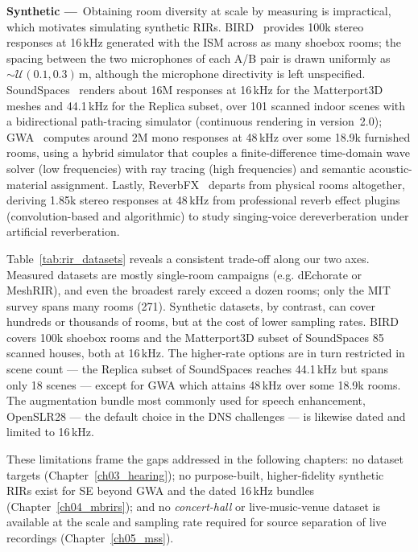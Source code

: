 \textbf{Synthetic ---}~Obtaining room diversity at scale by measuring is impractical, which motivates simulating synthetic \acrshort{RIR}s. BIRD~\citep{grondin2020bird} provides 100k stereo responses at 16\,kHz
generated with the \acrshort{ISM} across as many shoebox rooms; the spacing
between the two microphones of each A/B pair is drawn uniformly as
$\sim \mathcal{U}(0.1, 0.3)\,\text{m}$, although the microphone directivity is
left unspecified. SoundSpaces~\citep{chen2022soundspaces} renders about 16M
responses at 16\,kHz for the Matterport3D meshes and 44.1\,kHz for the Replica subset, over 101 scanned indoor scenes with a bidirectional
path-tracing simulator (continuous rendering in version~2.0); GWA~\citep{tang2022gwa} computes around 2M
mono responses at 48\,kHz over some 18.9k furnished rooms, using a hybrid
simulator that couples a finite-difference time-domain wave solver (low
frequencies) with ray tracing (high frequencies) and semantic
acoustic-material assignment. Lastly, ReverbFX~\citep{richter2025reverbfx}
departs from physical rooms altogether, deriving 1.85k stereo responses at
48\,kHz from professional reverb effect plugins (convolution-based and
algorithmic) to study singing-voice dereverberation under artificial
reverberation.

Table~\ref{tab:rir_datasets} reveals a consistent trade-off along our
two axes. Measured datasets are mostly single-room campaigns
(e.g. dEchorate or MeshRIR), and even the broadest rarely exceed a dozen rooms; only the MIT
survey spans many rooms (271). Synthetic datasets, by contrast, can cover hundreds or thousands of rooms, but
at the cost of lower sampling rates. BIRD covers 100k shoebox rooms and the Matterport3D subset of
SoundSpaces 85 scanned houses, both at 16\,kHz. The higher-rate options are
in turn restricted in scene count --- the Replica subset of
SoundSpaces reaches 44.1\,kHz but spans only 18 scenes --- except for GWA which
attains 48\,kHz over some 18.9k rooms. The augmentation bundle most commonly used
for speech enhancement, OpenSLR28 --- the default choice in the DNS
challenges --- is likewise dated and limited to 16\,kHz.

These limitations frame the gaps addressed in the following chapters: no
dataset targets  (Chapter~\ref{ch03_hearing}); no
purpose-built, higher-fidelity synthetic \acrshort{RIR}s exist for
\acrshort{SE} beyond GWA and the dated 16\,kHz bundles
(Chapter~\ref{ch04_mbrirs}); and no \emph{concert-hall} or live-music-venue
dataset is available at the scale and sampling rate required for source
separation of live recordings (Chapter~\ref{ch05_mss}).


